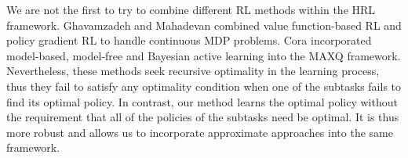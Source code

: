



We are not the first to try to combine different RL methods within the HRL framework.  
Ghavamzadeh and Mahadevan \cite{HybridPolicy} combined value function-based RL and policy gradient RL to handle
continuous MDP problems. Cora \cite{Vlad} incorporated model-based, model-free and Bayesian active learning into the MAXQ framework.
Nevertheless, these methods seek recursive optimality in the learning process, 
thus they fail to satisfy any optimality condition when one of the subtasks
fails to find its optimal policy.
In contrast, our method learns the optimal policy without the requirement that 
all of the policies of the subtasks need be optimal. It is thus more robust and allows us to incorporate approximate
approaches into the same framework.


